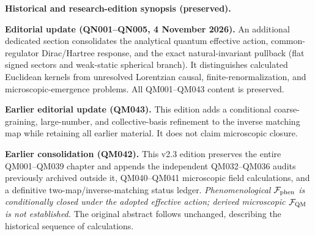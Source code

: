 \documentclass[11pt,a4paper]{article}
\begin{document}
\medskip\noindent\textbf{Historical and research-edition synopsis (preserved).}\par\smallskip
\noindent\textbf{Editorial update (QN001--QN005, 4 November 2026).} An additional dedicated section consolidates the analytical quantum effective action, common-regulator Dirac/Hartree response, and the exact natural-invariant pullback (flat signed sectors and weak-static spherical branch). It distinguishes calculated Euclidean kernels from unresolved Lorentzian causal, finite-renormalization, and microscopic-emergence problems. All QM001--QM043 content is preserved.\par\medskip
\noindent\textbf{Earlier editorial update (QM043).} This edition adds a conditional coarse-graining, large-number, and collective-basis refinement to the inverse matching map while retaining all earlier material. It does not claim microscopic closure.\par\medskip
\textbf{Earlier consolidation (QM042).} This v2.3 edition preserves the entire QM001--QM039 chapter and appends the independent QM032--QM036 audits previously archived outside it, QM040--QM041 microscopic field calculations, and a definitive two-map/inverse-matching status ledger. \emph{Phenomenological $\mathcal F_{\rm phen}$ is conditionally closed under the adopted effective action; derived microscopic $\mathcal F_{\rm QM}$ is not established.} The original abstract follows unchanged, describing the historical sequence of calculations.
\vspace{7pt}
\end{document}
